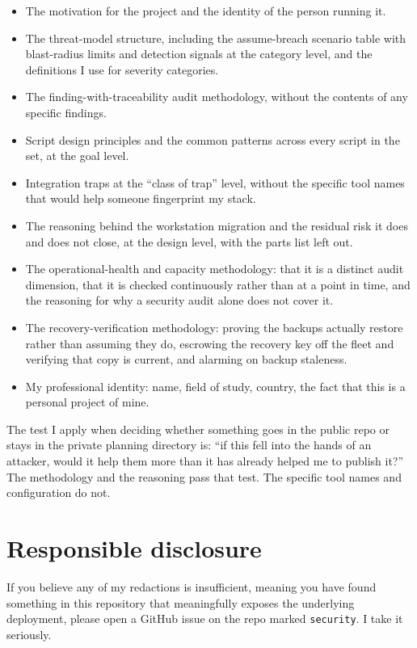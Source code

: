 \documentclass[12pt]{article}
\begin{document}
\begin{itemize}[leftmargin=18pt,itemsep=2pt]
  \item The motivation for the project and the identity of the person running it.
  \item The threat-model structure, including the assume-breach scenario table with blast-radius limits and detection signals at the category level, and the definitions I use for severity categories.
  \item The finding-with-traceability audit methodology, without the contents of any specific findings.
  \item Script design principles and the common patterns across every script in the set, at the goal level.
  \item Integration traps at the ``class of trap'' level, without the specific tool names that would help someone fingerprint my stack.
  \item The reasoning behind the workstation migration and the residual risk it does and does not close, at the design level, with the parts list left out.
  \item The operational-health and capacity methodology: that it is a distinct audit dimension, that it is checked continuously rather than at a point in time, and the reasoning for why a security audit alone does not cover it.
  \item The recovery-verification methodology: proving the backups actually restore rather than assuming they do, escrowing the recovery key off the fleet and verifying that copy is current, and alarming on backup staleness.
  \item My professional identity: name, field of study, country, the fact that this is a personal project of mine.
\end{itemize}

The test I apply when deciding whether something goes in the public repo or stays in the private planning directory is: ``if this fell into the hands of an attacker, would it help them more than it has already helped me to publish it?'' The methodology and the reasoning pass that test. The specific tool names and configuration do not.

\section{Responsible disclosure}

If you believe any of my redactions is insufficient, meaning you have found something in this repository that meaningfully exposes the underlying deployment, please open a GitHub issue on the repo marked \texttt{security}. I take it seriously.
\end{document}
